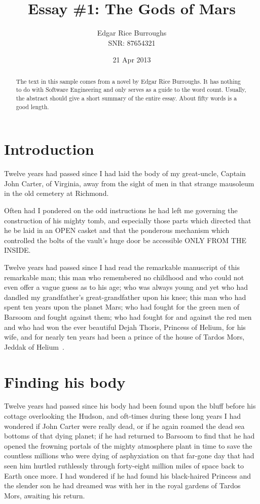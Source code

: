 \documentclass[11pt,a4paper,twocolumn]{article}
\begin{document}
\title{
	Essay \#1: The Gods of Mars
}
\author{
	Edgar Rice Burroughs \\
	SNR: 87654321
}
\date{21 Apr 2013}
\maketitle

\begin{abstract}
The text in this sample comes from a novel by Edgar Rice Burroughs.  It has
nothing to do with Software Engineering and only serves as a guide to the word
count.  Usually, the abstract should give a short summary of the entire essay.
About fifty words is a good length.
\end{abstract}

\section{Introduction}

Twelve years had passed since I had laid the body of my great-uncle, Captain
John Carter, of Virginia, away from the sight of men in that strange mausoleum
in the old cemetery at Richmond.

Often had I pondered on the odd instructions he had left me governing the
construction of his mighty tomb, and especially those parts which directed that
he be laid in an OPEN casket and that the ponderous mechanism which controlled
the bolts of the vault's huge door be accessible ONLY FROM THE INSIDE.

Twelve years had passed since I had read the remarkable manuscript of this
remarkable man; this man who remembered no childhood and who could not even
offer a vague guess as to his age; who was always young and yet who had dandled
my grandfather's great-grandfather upon his knee; this man who had spent ten
years upon the planet Mars; who had fought for the green men of Barsoom and
fought against them; who had fought for and against the red men and who had won
the ever beautiful Dejah Thoris, Princess of Helium, for his wife, and for
nearly ten years had been a prince of the house of Tardos Mors, Jeddak of
Helium~\cite{Basten2004}.

\section{Finding his body}

Twelve years had passed since his body had been found upon the bluff before his
cottage overlooking the Hudson, and oft-times during these long years I had
wondered if John Carter were really dead, or if he again roamed the dead sea
bottoms of that dying planet; if he had returned to Barsoom to find that he had
opened the frowning portals of the mighty atmosphere plant in time to save the
countless millions who were dying of asphyxiation on that far-gone day that had
seen him hurtled ruthlessly through forty-eight million miles of space back to
Earth once more.  I had wondered if he had found his black-haired Princess and
the slender son he had dreamed was with her in the royal gardens of Tardos
Mors, awaiting his return.
\end{document}
